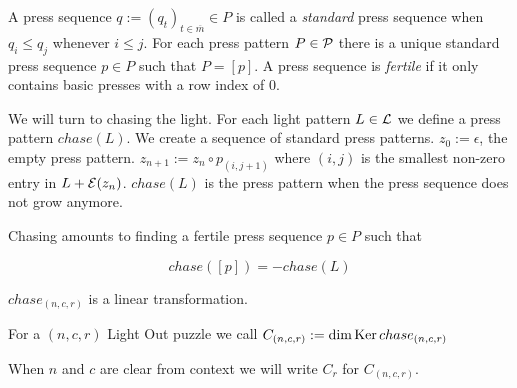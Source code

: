 A press sequence $q:=(q_{t})_{t\in\overline{m}}\in P$ is called a \emph{standard} press sequence when
$q_{i}\leq q_{j}$ whenever $i \leq j$. For each press pattern $P\in\mathcal{P}$ there is a unique standard 
press sequence $p\in P$ such that $P = [p]$.
A press sequence is \emph{fertile} if it only contains basic presses with a row index of 0.

We will turn to chasing the light. For each light pattern $L\in\mathcal{L}$ we define a press pattern
$chase(L)$. We create a sequence of standard press patterns. $z_{0} := \epsilon$, the empty
press pattern. $z_{n+1} := z_{n} \circ p_{(i,j+1)}$ where $(i,j)$ is the smallest non-zero entry
in $L+\mathcal{E}(z_{n})$. $chase(L)$ is the press pattern when the press sequence does not grow anymore.

Chasing amounts to finding a fertile press sequence $p\in P$ such that

\[
chase([p]) = -chase(L)
\]

$chase_{(n,c,r)}$ is a linear transformation.

\begin{definition}
    For a $(n,c,r)$ Light Out puzzle we call $C_{(n,c,r)} := \operatorname{dim} \operatorname{Ker} chase_{(n,c,r)}$
\end{definition}

When $n$ and $c$ are clear from context we will write $C_{r}$ for $C_{(n,c,r)}$.